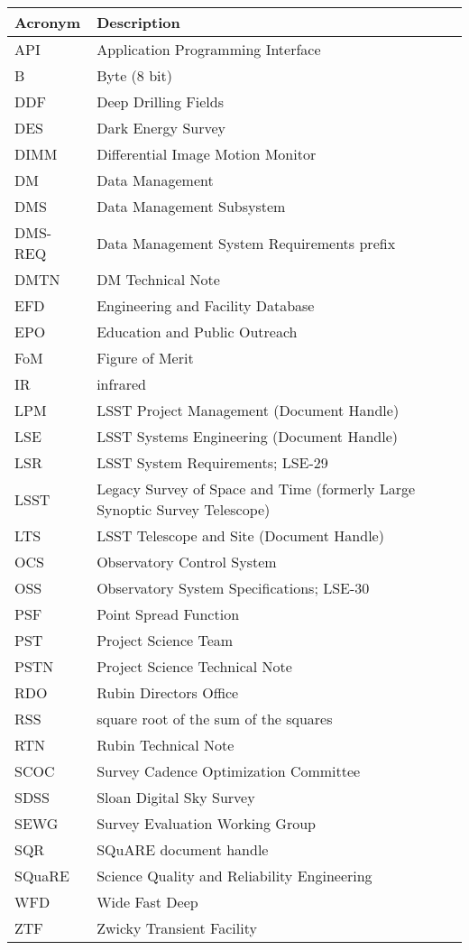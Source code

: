 \addtocounter{table}{-1}
\begin{longtable}{p{}p{}}\hline
\textbf{Acronym} & \textbf{Description}  \\\hline

API & Application Programming Interface \\\hline
B & Byte (8 bit) \\\hline
DDF & Deep Drilling Fields \\\hline
DES & Dark Energy Survey \\\hline
DIMM & Differential Image Motion Monitor \\\hline
DM & Data Management \\\hline
DMS & Data Management Subsystem \\\hline
DMS-REQ & Data Management System Requirements prefix \\\hline
DMTN & DM Technical Note \\\hline
EFD & Engineering and Facility Database \\\hline
EPO & Education and Public Outreach \\\hline
FoM & Figure of Merit \\\hline
IR & infrared \\\hline
LPM & LSST Project Management (Document Handle) \\\hline
LSE & LSST Systems Engineering (Document Handle) \\\hline
LSR & LSST System Requirements; LSE-29 \\\hline
LSST & Legacy Survey of Space and Time (formerly Large Synoptic Survey Telescope) \\\hline
LTS & LSST Telescope and Site  (Document Handle) \\\hline
OCS & Observatory Control System \\\hline
OSS & Observatory System Specifications; LSE-30 \\\hline
PSF & Point Spread Function \\\hline
PST & Project Science Team \\\hline
PSTN & Project Science Technical Note \\\hline
RDO & Rubin Directors Office \\\hline
RSS & square root of the sum of the squares \\\hline
RTN & Rubin Technical Note \\\hline
SCOC & Survey Cadence Optimization Committee \\\hline
SDSS & Sloan Digital Sky Survey \\\hline
SEWG & Survey Evaluation Working Group \\\hline
SQR & SQuARE document handle \\\hline
SQuaRE & Science Quality and Reliability Engineering \\\hline
WFD & Wide Fast Deep \\\hline
ZTF & Zwicky Transient Facility \\\hline
\end{longtable}
